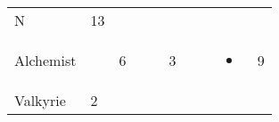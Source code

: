 \documentclass[12pt]{article}
\begin{document}
\begin{longtable}[]{@{}llllllllll@{}}
\begin{minipage}[t]{0.07\columnwidth}\raggedright\strut
N
\strut\end{minipage} &
\begin{minipage}[t]{0.08\columnwidth}\raggedright\strut
13
\strut\end{minipage}\tabularnewline
\begin{minipage}[t]{0.13\columnwidth}\raggedright\strut
Alchemist
\strut\end{minipage} &
\begin{minipage}[t]{0.06\columnwidth}\raggedright\strut
\strut\end{minipage} &
\begin{minipage}[t]{0.06\columnwidth}\raggedright\strut
6
\strut\end{minipage} &
\begin{minipage}[t]{0.06\columnwidth}\raggedright\strut
\strut\end{minipage} &
\begin{minipage}[t]{0.06\columnwidth}\raggedright\strut
\strut\end{minipage} &
\begin{minipage}[t]{0.06\columnwidth}\raggedright\strut
3
\strut\end{minipage} &
\begin{minipage}[t]{0.06\columnwidth}\raggedright\strut
\strut\end{minipage} &
\begin{minipage}[t]{0.06\columnwidth}\raggedright\strut
\strut\end{minipage} &
\begin{minipage}[t]{0.07\columnwidth}\raggedright\strut
\begin{itemize}
\item
\end{itemize}
\strut\end{minipage} &
\begin{minipage}[t]{0.08\columnwidth}\raggedright\strut
9
\strut\end{minipage}\tabularnewline
\begin{minipage}[t]{0.13\columnwidth}\raggedright\strut
Valkyrie
\strut\end{minipage} &
\begin{minipage}[t]{0.06\columnwidth}\raggedright\strut
2
\strut\end{minipage} &
\begin{minipage}[t]{0.06\columnwidth}\raggedright\strut
\strut\end{minipage} &
\begin{minipage}[t]{0.06\columnwidth}\raggedright\strut

\end{minipage}
\end{longtable}
\end{document}

